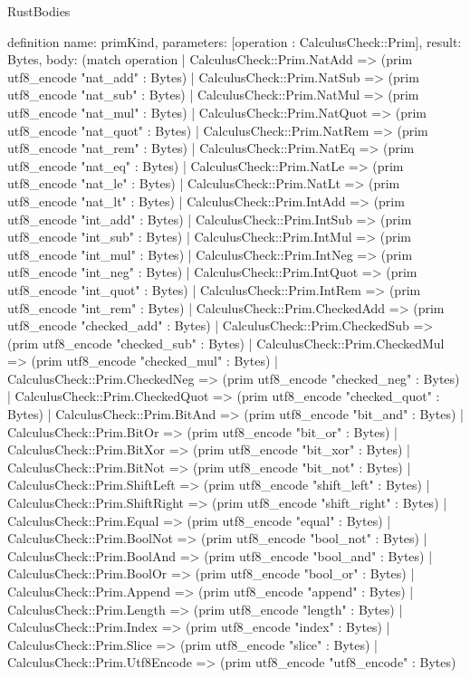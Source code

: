 \begin{lexlean}{RustBodies}
\begin{semanticmodule}
definition{
  name: primKind,
  parameters: [operation : CalculusCheck::Prim],
  result: Bytes,
  body: (match operation
    | CalculusCheck::Prim.NatAdd => (prim utf8_encode "nat_add" : Bytes)
    | CalculusCheck::Prim.NatSub => (prim utf8_encode "nat_sub" : Bytes)
    | CalculusCheck::Prim.NatMul => (prim utf8_encode "nat_mul" : Bytes)
    | CalculusCheck::Prim.NatQuot => (prim utf8_encode "nat_quot" : Bytes)
    | CalculusCheck::Prim.NatRem => (prim utf8_encode "nat_rem" : Bytes)
    | CalculusCheck::Prim.NatEq => (prim utf8_encode "nat_eq" : Bytes)
    | CalculusCheck::Prim.NatLe => (prim utf8_encode "nat_le" : Bytes)
    | CalculusCheck::Prim.NatLt => (prim utf8_encode "nat_lt" : Bytes)
    | CalculusCheck::Prim.IntAdd => (prim utf8_encode "int_add" : Bytes)
    | CalculusCheck::Prim.IntSub => (prim utf8_encode "int_sub" : Bytes)
    | CalculusCheck::Prim.IntMul => (prim utf8_encode "int_mul" : Bytes)
    | CalculusCheck::Prim.IntNeg => (prim utf8_encode "int_neg" : Bytes)
    | CalculusCheck::Prim.IntQuot => (prim utf8_encode "int_quot" : Bytes)
    | CalculusCheck::Prim.IntRem => (prim utf8_encode "int_rem" : Bytes)
    | CalculusCheck::Prim.CheckedAdd => (prim utf8_encode "checked_add" : Bytes)
    | CalculusCheck::Prim.CheckedSub => (prim utf8_encode "checked_sub" : Bytes)
    | CalculusCheck::Prim.CheckedMul => (prim utf8_encode "checked_mul" : Bytes)
    | CalculusCheck::Prim.CheckedNeg => (prim utf8_encode "checked_neg" : Bytes)
    | CalculusCheck::Prim.CheckedQuot => (prim utf8_encode "checked_quot" : Bytes)
    | CalculusCheck::Prim.BitAnd => (prim utf8_encode "bit_and" : Bytes)
    | CalculusCheck::Prim.BitOr => (prim utf8_encode "bit_or" : Bytes)
    | CalculusCheck::Prim.BitXor => (prim utf8_encode "bit_xor" : Bytes)
    | CalculusCheck::Prim.BitNot => (prim utf8_encode "bit_not" : Bytes)
    | CalculusCheck::Prim.ShiftLeft => (prim utf8_encode "shift_left" : Bytes)
    | CalculusCheck::Prim.ShiftRight => (prim utf8_encode "shift_right" : Bytes)
    | CalculusCheck::Prim.Equal => (prim utf8_encode "equal" : Bytes)
    | CalculusCheck::Prim.BoolNot => (prim utf8_encode "bool_not" : Bytes)
    | CalculusCheck::Prim.BoolAnd => (prim utf8_encode "bool_and" : Bytes)
    | CalculusCheck::Prim.BoolOr => (prim utf8_encode "bool_or" : Bytes)
    | CalculusCheck::Prim.Append => (prim utf8_encode "append" : Bytes)
    | CalculusCheck::Prim.Length => (prim utf8_encode "length" : Bytes)
    | CalculusCheck::Prim.Index => (prim utf8_encode "index" : Bytes)
    | CalculusCheck::Prim.Slice => (prim utf8_encode "slice" : Bytes)
    | CalculusCheck::Prim.Utf8Encode => (prim utf8_encode "utf8_encode" : Bytes)
}
\end{semanticmodule}
\end{lexlean}
